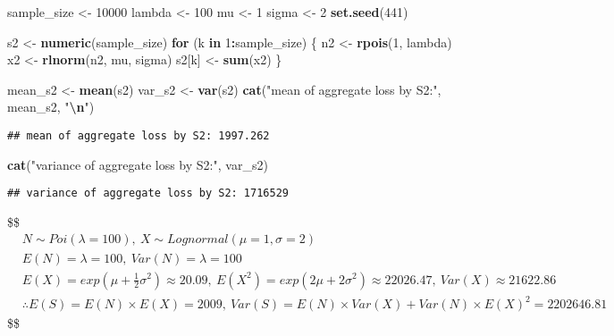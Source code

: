 \documentclass[
]{article}
\newenvironment{Shaded}{\begin{snugshade}}{\end{snugshade}}
\newcommand{\ControlFlowTok}[1]{\textcolor[rgb]{0.13,0.29,0.53}{\textbf{#1}}}
\newcommand{\DecValTok}[1]{\textcolor[rgb]{0.00,0.00,0.81}{#1}}
\newcommand{\FunctionTok}[1]{\textcolor[rgb]{0.13,0.29,0.53}{\textbf{#1}}}
\newcommand{\NormalTok}[1]{#1}
\newcommand{\OtherTok}[1]{\textcolor[rgb]{0.56,0.35,0.01}{#1}}
\newcommand{\SpecialCharTok}[1]{\textcolor[rgb]{0.81,0.36,0.00}{\textbf{#1}}}
\newcommand{\StringTok}[1]{\textcolor[rgb]{0.31,0.60,0.02}{#1}}
\begin{document}
\begin{Shaded}
\begin{Highlighting}[]
\NormalTok{sample\_size }\OtherTok{\textless{}{-}} \DecValTok{10000}
\NormalTok{lambda }\OtherTok{\textless{}{-}} \DecValTok{100}
\NormalTok{mu }\OtherTok{\textless{}{-}} \DecValTok{1}
\NormalTok{sigma }\OtherTok{\textless{}{-}} \DecValTok{2}
\FunctionTok{set.seed}\NormalTok{(}\DecValTok{441}\NormalTok{)}

\NormalTok{s2 }\OtherTok{\textless{}{-}} \FunctionTok{numeric}\NormalTok{(sample\_size)}
\ControlFlowTok{for}\NormalTok{ (k }\ControlFlowTok{in} \DecValTok{1}\SpecialCharTok{:}\NormalTok{sample\_size) \{}
\NormalTok{  n2 }\OtherTok{\textless{}{-}} \FunctionTok{rpois}\NormalTok{(}\DecValTok{1}\NormalTok{, lambda)}
\NormalTok{  x2 }\OtherTok{\textless{}{-}} \FunctionTok{rlnorm}\NormalTok{(n2, mu, sigma)}
\NormalTok{  s2[k] }\OtherTok{\textless{}{-}} \FunctionTok{sum}\NormalTok{(x2)}
\NormalTok{\}}

\NormalTok{mean\_s2 }\OtherTok{\textless{}{-}} \FunctionTok{mean}\NormalTok{(s2)}
\NormalTok{var\_s2 }\OtherTok{\textless{}{-}} \FunctionTok{var}\NormalTok{(s2)}
\FunctionTok{cat}\NormalTok{(}\StringTok{"mean of aggregate loss by S2:"}\NormalTok{, mean\_s2, }\StringTok{"}\SpecialCharTok{\textbackslash{}n}\StringTok{"}\NormalTok{)}
\end{Highlighting}
\end{Shaded}

\begin{verbatim}
## mean of aggregate loss by S2: 1997.262
\end{verbatim}

\begin{Shaded}
\begin{Highlighting}[]
\FunctionTok{cat}\NormalTok{(}\StringTok{"variance of aggregate loss by S2:"}\NormalTok{, var\_s2)}
\end{Highlighting}
\end{Shaded}

\begin{verbatim}
## variance of aggregate loss by S2: 1716529
\end{verbatim}

\$\$ \begin{align*}

& N \sim Poi(\lambda = 100), \: X \sim Lognormal(\mu = 1, \sigma = 2)
\\
& E(N) = \lambda = 100, \: Var(N) = \lambda = 100
\\
& E(X) = exp(\mu + \frac{1}{2}\sigma^{2}) \approx 20.09, \: E(X^{2}) = exp(2\mu + 2\sigma^{2}) \approx 22026.47, \: Var(X) \approx 21622.86
\\
& \therefore E(S) = E(N) \times E(X) = 2009, \: Var(S) = E(N) \times Var(X) + Var(N) \times E(X)^{2} = 2202646.81

\end{align*} \$\$
\end{document}
